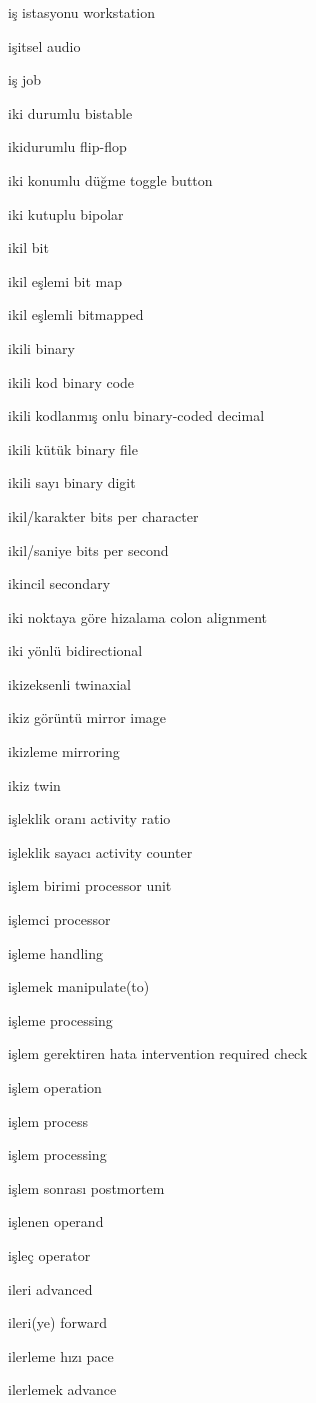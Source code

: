 \documentclass[12pt,fleqn]{article}\usepackage{../../common}
\begin{document}
iş istasyonu workstation

işitsel audio

iş job

iki durumlu bistable

ikidurumlu flip-flop

iki konumlu düğme toggle button

iki kutuplu bipolar

ikil bit

ikil eşlemi bit map

ikil eşlemli bitmapped

ikili binary

ikili kod binary code

ikili kodlanmış onlu binary-coded decimal

ikili kütük binary file

ikili sayı binary digit

ikil/karakter bits per character

ikil/saniye bits per second

ikincil secondary

iki noktaya göre hizalama colon alignment

iki yönlü bidirectional

ikizeksenli twinaxial

ikiz görüntü mirror image

ikizleme mirroring

ikiz twin

işleklik oranı activity ratio

işleklik sayacı activity counter

işlem birimi processor unit

işlemci processor

işleme handling

işlemek manipulate(to)

işleme processing

işlem gerektiren hata intervention required check

işlem operation

işlem process

işlem processing

işlem sonrası postmortem

işlenen operand

işleç operator

ileri advanced

ileri(ye) forward

ilerleme hızı pace

ilerlemek advance
\end{document}
